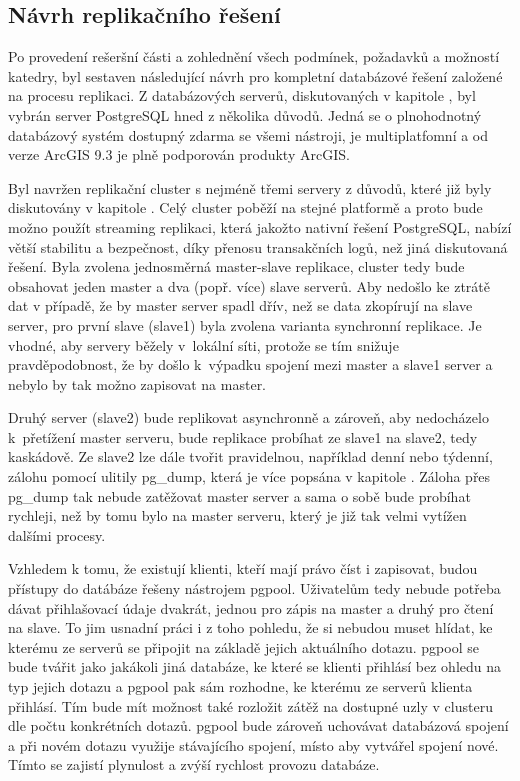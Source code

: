 \subsection{Návrh replikačního řešení}
\label{kNavrh}

Po provedení rešeršní části a zohlednění všech podmínek, požadavků a možností katedry, byl sestaven následující návrh pro kompletní databázové řešení založené na procesu replikaci. Z databázových serverů, diskutovaných v kapitole , byl vybrán server PostgreSQL hned z několika důvodů. Jedná se o plnohodnotný databázový systém dostupný zdarma se všemi nástroji, je multiplatfomní a od verze ArcGIS 9.3 je plně podporován produkty ArcGIS. 

Byl navržen replikační cluster s nejméně třemi servery z důvodů, které již byly diskutovány v kapitole . Celý cluster poběží na stejné platformě a proto bude možno použít streaming replikaci, která jakožto nativní řešení PostgreSQL, nabízí větší stabilitu a bezpečnost, díky přenosu transakčních logů, než jiná diskutovaná řešení. Byla zvolena jednosměrná master-slave replikace, cluster tedy bude obsahovat jeden master a dva (popř. více) slave serverů. Aby nedošlo ke ztrátě dat v případě, že by master server spadl dřív, než se data zkopírují na slave server, pro první slave (slave1) byla zvolena varianta synchronní replikace. Je vhodné, aby servery běžely v~lokální síti, protože se tím snižuje pravděpodobnost, že by došlo k~výpadku spojení mezi master a slave1 server a nebylo by tak možno zapisovat na master. 

Druhý server (slave2) bude replikovat asynchronně a zároveň, aby nedocházelo k~přetížení master serveru, bude replikace probíhat ze slave1 na slave2, tedy kaskádově. Ze slave2 lze dále tvořit pravidelnou, například denní nebo týdenní, zálohu pomocí ulitily pg\_dump, která je více popsána v kapitole . Záloha přes pg\_dump tak nebude zatěžovat master server a sama o sobě bude probíhat rychleji, než by tomu bylo na master serveru, který je již tak velmi vytížen dalšími procesy.


Vzhledem k tomu, že existují klienti, kteří mají právo číst i zapisovat, budou přístupy do datábáze řešeny nástrojem pgpool. Uživatelům tedy nebude potřeba dávat přihlašovací údaje dvakrát, jednou pro zápis na master a druhý pro čtení na slave. To jim usnadní práci i z toho pohledu, že si nebudou muset hlídat, ke kterému ze serverů se připojit na základě jejich aktuálního dotazu. pgpool se bude tvářit jako jakákoli jiná databáze, ke které se klienti přihlásí bez ohledu na typ jejich dotazu a pgpool pak sám rozhodne, ke kterému ze serverů klienta přihlásí. Tím bude mít možnost také rozložit zátěž na dostupné uzly v clusteru dle počtu konkrétních dotazů. pgpool bude zároveň uchovávat databázová spojení a při novém dotazu využije stávajícího spojení, místo aby vytvářel spojení nové. Tímto se zajistí plynulost a zvýší rychlost provozu databáze.



